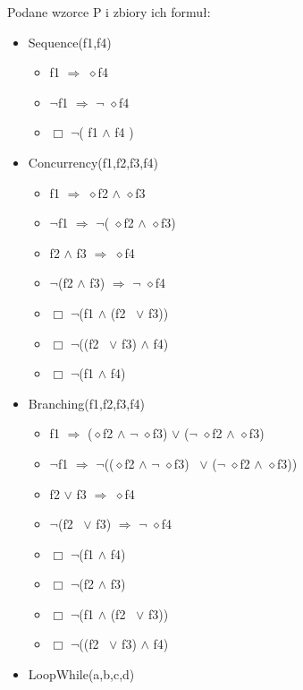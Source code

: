 \documentclass[a4paper, 11pt]{article}
\begin{document}
Podane wzorce P i zbiory ich formuł:
	\begin{itemize}
					\item Sequence(f1,f4)
		\begin{itemize}
			\item f1 $ \Rightarrow $  $\diamond$f4 	
			\item $\neg$f1 $ \Rightarrow $ $\neg$ $\diamond$f4
			\item $\Box$ $\neg$( f1  $\wedge$  f4 )
		\end{itemize}
		\item Concurrency(f1,f2,f3,f4)
		\begin{itemize}
			\item f1 $ \Rightarrow $  $\diamond$f2  $\wedge$  $\diamond$f3
			\item $\neg$f1 $ \Rightarrow $  $\neg$( $\diamond$f2  $\wedge$  $\diamond$f3)
			\item f2  $\wedge$  f3  $ \Rightarrow$  $\diamond$f4
			\item $\neg$(f2  $\wedge$  f3)  $ \Rightarrow $  $\neg$ $\diamond$f4
			\item $\Box$ $\neg$(f1  $\wedge$  (f2 \ $\vee$  f3))
			\item $\Box$ $\neg$((f2 \ $\vee$  f3)  $\wedge$  f4)
			\item $\Box$ $\neg$(f1  $\wedge$  f4)	
		\end{itemize}
		\item Branching(f1,f2,f3,f4)
		\begin{itemize}
			\item f1  $ \Rightarrow $  ($\diamond$f2  $\wedge$  $\neg$ $\diamond$f3)  $\vee$  ($\neg$ $\diamond$f2  $\wedge$  $\diamond$f3)
			\item $\neg$f1  $ \Rightarrow $  $\neg$(($\diamond$f2  $\wedge$  $\neg$ $\diamond$f3) \ $\vee$  ($\neg$ $\diamond$f2  $\wedge$  $\diamond$f3))
			\item f2 $\vee$  f3  $ \Rightarrow $  $\diamond$f4
			\item $\neg$(f2 \ $\vee$  f3)  $ \Rightarrow$  $\neg$ $\diamond$f4
			\item $\Box$ $\neg$(f1  $\wedge$  f4)
			\item $\Box$ $\neg$(f2  $\wedge$  f3)
			\item $\Box$ $\neg$(f1  $\wedge$  (f2 \ $\vee$  f3))
			\item $\Box$ $\neg$((f2 \ $\vee$  f3)  $\wedge$  f4)
		\end{itemize}
		\item LoopWhile(a,b,c,d)
		\begin{itemize}

\end{itemize}
\end{itemize}
\end{document}
